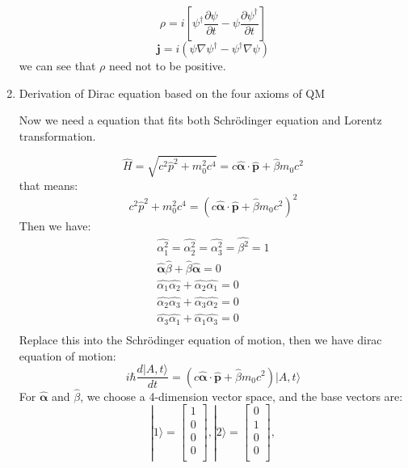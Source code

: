 \documentclass[12pt]{article}
\numberwithin{equation}{section}
\begin{document}
\begin{enumerate}
\begin{equation}
		\rho=i[\psi^\dag\frac{\partial \psi}{\partial t}-\psi\frac{\partial \psi^\dag}{\partial t}]
	\end{equation}
	\begin{equation}
		\mathbf{j}=i(\psi\nabla\psi^\dag-\psi^\dag\nabla\psi)
	\end{equation}
	we can see that {\color{orange}$\rho$ need not to be positive}.
\item Derivation of Dirac equation based on the four axioms of QM \par
	Now we need a equation that fits both Schr\"{o}dinger equation and Lorentz transformation.\par
	\begin{equation}
		\hat{H}=\sqrt{c^2\hat{p}^2+m_0^2c^4}
		=c\hat{\bm{\alpha}}\cdot\hat{\mathbf{p}}+\hat{\beta} m_0c^2
	\end{equation}
	that means:
	\begin{equation} 
		c^2\hat{p}^2+m_0^2c^4
		=(c\hat{\bm{\alpha}}\cdot\hat{\mathbf{p}}+\hat{\beta} m_0c^2)^2
	\end{equation}
	Then we have:
	\begin{equation}\begin{split}
		\hat{\alpha_1^2}=\hat{\alpha_2^2}=\hat{\alpha_3^2}=\hat{\beta^2}=1 \\
		\hat{\bm{\alpha}}\hat{\beta}+\hat{\beta}\hat{\bm{\alpha}}=0 \\
		\hat{\alpha_1}\hat{\alpha_2}+\hat{\alpha_2}\hat{\alpha_1}=0 \\
		\hat{\alpha_2}\hat{\alpha_3}+\hat{\alpha_3}\hat{\alpha_2}=0 \\
		\hat{\alpha_3}\hat{\alpha_1}+\hat{\alpha_1}\hat{\alpha_3}=0 \\
	\end{split}\end{equation}
	Replace this into the Schr\"{o}dinger equation of motion, then we have dirac equation of motion:
	\begin{equation}
		i\hbar\frac{d|A,t\rangle}{dt}=
		(c\hat{\bm{\alpha}}\cdot\hat{\mathbf{p}}+\hat{\beta} m_0c^2)|A,t\rangle
	\end{equation}
	For $\hat{\bm{\alpha}}$ and $\hat{\beta}$, we choose a 4-dimension vector space, and the base vectors are:
	\[|1\rangle=\begin{bmatrix}1\\ 0\\ 0\\ 0\\\end{bmatrix}, 
	|2\rangle=\begin{bmatrix}0\\ 1\\ 0\\ 0\\\end{bmatrix},
\]
\end{enumerate}
\end{document}
